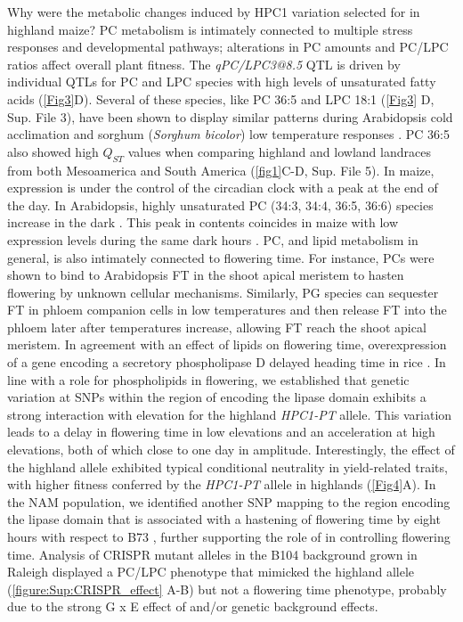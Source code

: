 Why were the metabolic changes induced by HPC1 variation selected for in highland maize?
PC metabolism is intimately connected to multiple stress responses and developmental pathways; alterations in PC amounts and PC/LPC ratios affect overall plant fitness.
The \textit{qPC/LPC3@8.5} QTL is driven by individual QTLs for PC and LPC species with high levels of unsaturated fatty acids (\autoref{Fig3}D).
Several of these species, like PC 36:5 and LPC 18:1 (\autoref{Fig3} D, Sup. File 3), have been shown to display similar patterns during Arabidopsis cold acclimation \citep{welti2002-uk} and sorghum (\textit{Sorghum bicolor}) low temperature responses \citep{marla2017-ph}.
PC 36:5 also showed high $Q_{ST}$ values when comparing highland and lowland landraces from both Mesoamerica and South America (\autoref{fig1}C-D, Sup. File 5).
In maize, \hpc expression is under the control of the circadian clock \citep{khan2010-iv} with a peak at the end of the day. 
In Arabidopsis, highly unsaturated PC (34:3, 34:4, 36:5, 36:6) species increase in the dark \citep{maatta2012-ip}. 
This peak in contents coincides in maize with low \hpc expression levels during the same dark hours \citep{khan2010-iv}.
PC, and lipid metabolism in general, is also intimately connected to flowering time. 
For instance, PCs were shown to bind to Arabidopsis FT in the shoot apical meristem to hasten flowering \citep{nakamura2014-qf, nakamura2019-ht} by unknown cellular mechanisms. 
Similarly, PG species can sequester FT in phloem companion cells in low temperatures \citep{susila2021-dz} and then release FT into the phloem later after temperatures increase, allowing FT reach the shoot apical meristem.   
In agreement with an effect of lipids on flowering time, overexpression of a gene encoding a secretory phospholipase D delayed heading time in rice \citep{qu2021-wc}.
In line with a role for phospholipids in flowering, we established that genetic variation at SNPs within the region of \hpc encoding the lipase domain exhibits a strong interaction with elevation for the highland \textit{HPC1-PT} allele. 
This variation leads to a delay in flowering time in low elevations and an acceleration at high elevations, both of which close to one day in amplitude. 
Interestingly, the effect of the highland \hpc allele exhibited typical conditional neutrality in yield-related traits, with higher fitness conferred by the \textit{HPC1-PT} allele in highlands (\autoref{Fig4}A). 
In the NAM population, we identified another SNP mapping to the region encoding the lipase domain that is associated with a hastening of flowering time by eight hours with respect to B73 \citep{wallace2014-yy}, further supporting the role of \hpc in controlling flowering time. 
Analysis of \hpc CRISPR mutant alleles in the B104 background grown in Raleigh displayed a PC/LPC phenotype that mimicked the highland allele (\autoref{figure:Sup:CRISPR_effect} A-B) but not a flowering time phenotype, probably due to the strong G x E effect of \hpc and/or genetic background effects. 

